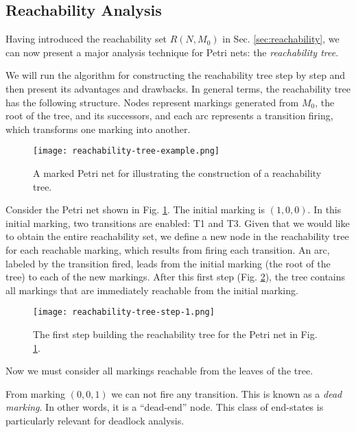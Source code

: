 \subsection{Reachability Analysis}

Having introduced the reachability set $R(N, M_0)$ in Sec. \ref{sec:reachability},
we can now present a major analysis technique for Petri nets: the \emph{reachability tree}.

We will run the algorithm for constructing the reachability tree step by step
and then present its advantages and drawbacks.
In general terms, the reachability tree has the following structure.
Nodes represent markings generated from $M_0$, the root of the tree, and its successors,
and each arc represents a transition firing, which transforms one marking into another.

\begin{figure}
    \centering
    \texttt{[image: reachability-tree-example.png]}
    \caption{A marked Petri net for illustrating the construction of a reachability tree.}
    \label{fig:reachability-tree-example}
\end{figure}

Consider the Petri net shown in Fig. \ref{fig:reachability-tree-example}.
The initial marking is $(1, 0, 0)$.
In this initial marking, two transitions are enabled: T1 and T3.
Given that we would like to obtain the entire reachability set,
we define a new node in the reachability tree for each reachable marking,
which results from firing each transition.
An arc, labeled by the transition fired, leads from the initial marking
(the root of the tree) to each of the new markings.
After this first step (Fig. \ref{fig:reachability-tree-step-1}), the tree contains all markings
that are immediately reachable from the initial marking.

\begin{figure}
    \centering
    \texttt{[image: reachability-tree-step-1.png]}
    \caption{The first step building the reachability tree
        for the Petri net in Fig. \ref{fig:reachability-tree-example}.}
    \label{fig:reachability-tree-step-1}
\end{figure}

Now we must consider all markings reachable from the leaves of the tree.

From marking $(0,0,1)$ we can not fire any transition.
This is known as a \emph{dead marking}.
In other words, it is a ``dead-end'' node.
This class of end-states is particularly relevant for deadlock analysis.

